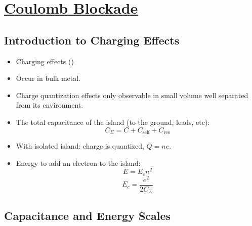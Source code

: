 
\section[Coulomb Blockade]{\hyperlink{toc}{Coulomb Blockade}}

\subsection{Introduction to Charging Effects}

\begin{itemize}
    \item Charging effects ()
    \item Occur in bulk metal.
    \item Charge quantization effects only observable in small volume well separated from its environment.
    \item The total capacitance of the island (to the ground, leads, etc):
          \[ C_{\Sigma} = C + C_{\text{self}} + C_{\text{res}} \]
    \item With isolated island: charge is quantized, $Q = ne$.
    \item Energy to add an electron to the island:
          \[ E = E_c n^2 \]
          \[ E_c = \frac{e^2}{2C_{\Sigma}} \]
\end{itemize}

\subsection{Capacitance and Energy Scales}

